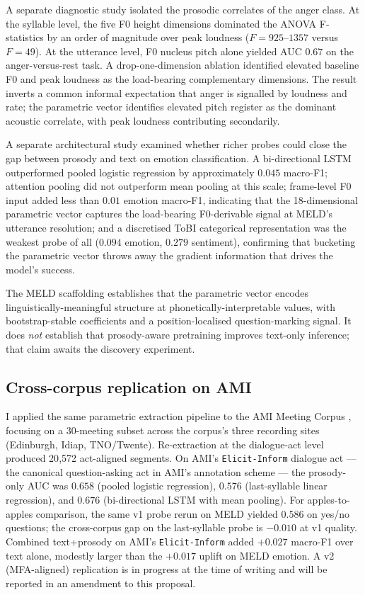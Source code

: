 \documentclass[11pt,letterpaper]{article}
\begin{document}
A separate diagnostic study isolated the prosodic correlates of the anger class. At the syllable level, the five F0 height dimensions dominated the ANOVA F-statistics by an order of magnitude over peak loudness ($F = 925$--$1357$ versus $F = 49$). At the utterance level, F0 nucleus pitch alone yielded AUC $0.67$ on the anger-versus-rest task. A drop-one-dimension ablation identified elevated baseline F0 and peak loudness as the load-bearing complementary dimensions. The result inverts a common informal expectation that anger is signalled by loudness and rate; the parametric vector identifies elevated pitch register as the dominant acoustic correlate, with peak loudness contributing secondarily.

A separate architectural study examined whether richer probes could close the gap between prosody and text on emotion classification. A bi-directional LSTM outperformed pooled logistic regression by approximately $0.045$ macro-F1; attention pooling did not outperform mean pooling at this scale; frame-level F0 input added less than $0.01$ emotion macro-F1, indicating that the 18-dimensional parametric vector captures the load-bearing F0-derivable signal at MELD's utterance resolution; and a discretised ToBI categorical representation was the weakest probe of all ($0.094$ emotion, $0.279$ sentiment), confirming that bucketing the parametric vector throws away the gradient information that drives the model's success.

The MELD scaffolding establishes that the parametric vector encodes linguistically-meaningful structure at phonetically-interpretable values, with bootstrap-stable coefficients and a position-localised question-marking signal. It does \emph{not} establish that prosody-aware pretraining improves text-only inference; that claim awaits the discovery experiment.

\subsection{Cross-corpus replication on AMI}

I applied the same parametric extraction pipeline to the AMI Meeting Corpus \citep{carletta2007ami}, focusing on a 30-meeting subset across the corpus's three recording sites (Edinburgh, Idiap, TNO/Twente). Re-extraction at the dialogue-act level produced 20{,}572 act-aligned segments. On AMI's \texttt{Elicit-Inform} dialogue act --- the canonical question-asking act in AMI's annotation scheme --- the prosody-only AUC was $0.658$ (pooled logistic regression), $0.576$ (last-syllable linear regression), and $0.676$ (bi-directional LSTM with mean pooling). For apples-to-apples comparison, the same v1 probe rerun on MELD yielded $0.586$ on yes/no questions; the cross-corpus gap on the last-syllable probe is $-0.010$ at v1 quality. Combined text+prosody on AMI's \texttt{Elicit-Inform} added $+0.027$ macro-F1 over text alone, modestly larger than the $+0.017$ uplift on MELD emotion. A v2 (MFA-aligned) replication is in progress at the time of writing and will be reported in an amendment to this proposal.
\end{document}
